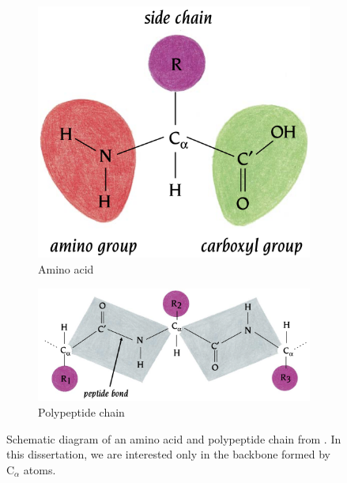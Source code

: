 \documentclass[a4paper,12pt]{article}
\begin{document}
\begin{figure}[htbp]
    \centering
    \begin{subfigure}[b]{0.4\textwidth}
        \centering
        \includegraphics[width=\linewidth]{amino_acid.png}
        \caption{Amino acid}
        \label{fig:amino_acid}
    \end{subfigure}
    \begin{subfigure}[b]{0.75\textwidth}
        \centering
        \includegraphics[width=\textwidth]{polypeptide_chain.png}
        \caption{Polypeptide chain}
        \label{fig:polypeptide_chain}
    \end{subfigure}
    \caption{Schematic diagram of an amino acid and polypeptide chain from \citet{branden2012IntroductionProteinStructure}. In this dissertation, we are interested only in the backbone formed by C\(_\alpha\) atoms.}
\end{figure}
\end{document}
